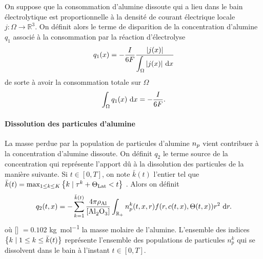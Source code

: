 On suppose que la consommation d'alumine dissoute qui a lieu dans le
bain électrolytique est proportionnelle à la densité de courant
électrique locale $j:\Omega\to\mathbb R^3$. On définit alors le terme
de disparition de la concentration d'alumine $q_1$ associé à la
consommation par la réaction d'électrolyse
\begin{equation}
  q_1(x) = -\frac{I}{6\faraday} %
  \frac{\abs{j(x)}}{\displaystyle\int_\Omega\abs{j(x)}\intd{x}}
\end{equation}
de sorte à avoir la consommation totale sur $\Omega$
\begin{equation}
  \int_\Omega q_1(x)\,\,\mathrm dx = -\frac{I}{6F}.
\end{equation}

\paragraph{Dissolution des particules d'alumine}
La masse perdue par la population de particules d'alumine
$n_p$ vient contribuer à la concentration d'alumine
dissoute. On définit $q_2$ le terme source de la concentration
qui représente l'apport dû à la dissolution des particules de la
manière suivante. Si $t \in [0, T]$, on note $\bar k(t)$ l'entier tel
que $\bar k(t) = \max_{1\leq k\leq K}\left\{ k \mid \tau^k + \Theta_\text{Lat} < t \right\}$ . Alors on définit
\begin{equation}
  q_2(t, x) = -\sum_{k = 1}^{\bar
    k(t)}\frac{4\pi\aluminadensity}{[\ce{Al2O3}]}\int_{\rplus}n_p^k(t,
  x, r)f(r, \concentration(t, x), \temperature(t, x))r^2\,\intd{r}.
\end{equation}
où [] $ = \num{0.102}$ \si{\kilo\gram\per\mol} la masse
molaire de l'alumine. L'ensemble des indices $\left\{ k \mid 1\leq k
  \leq \bar k (t) \right\}$ représente l'ensemble des populations de particules
$n_p^k$ qui se dissolvent dans le bain à l'instant $t\in[0, T]$.

